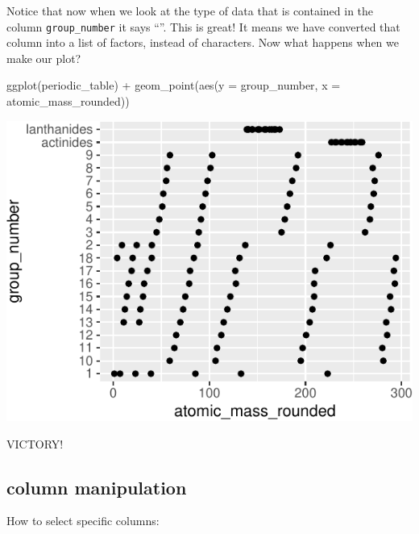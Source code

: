 \documentclass[
]{krantz}
\newenvironment{Shaded}{\begin{snugshade}}{\end{snugshade}}
\newcommand{\AttributeTok}[1]{\textcolor[rgb]{0.77,0.63,0.00}{#1}}
\newcommand{\FunctionTok}[1]{\textcolor[rgb]{0.00,0.00,0.00}{#1}}
\newcommand{\NormalTok}[1]{#1}
\newcommand{\SpecialCharTok}[1]{\textcolor[rgb]{0.00,0.00,0.00}{#1}}
\begin{document}
Notice that now when we look at the type of data that is contained in the column \texttt{group\_number} it says ``''. This is great! It means we have converted that column into a list of factors, instead of characters. Now what happens when we make our plot?

\begin{Shaded}
\begin{Highlighting}[]
\FunctionTok{ggplot}\NormalTok{(periodic\_table) }\SpecialCharTok{+}
  \FunctionTok{geom\_point}\NormalTok{(}\FunctionTok{aes}\NormalTok{(}\AttributeTok{y =}\NormalTok{ group\_number, }\AttributeTok{x =}\NormalTok{ atomic\_mass\_rounded))}
\end{Highlighting}
\end{Shaded}

\begin{center}\includegraphics{index_files/figure-latex/unnamed-chunk-190-1} \end{center}

VICTORY!

\hypertarget{column-manipulation}{%
\subsection{column manipulation}\label{column-manipulation}}

How to select specific columns:
\end{document}
